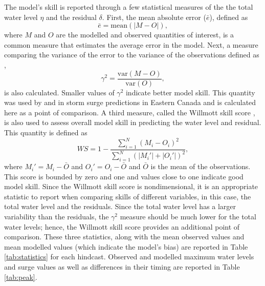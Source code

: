 \documentclass[letterpaper]{tATO2e}
\begin{document}
The model's skill is reported through a few statistical measures of the the total water level $\eta$ and the residual $\delta$. First, the mean absolute error ($\bar{e}$), defined as
\begin{equation}
\bar{e} = \text{mean}\left(\left| M - O \right|\right),
\end{equation}
where $M$ and $O$ are the modelled and observed quantities of interest, is a common measure that estimates the average error in the model. Next, a measure comparing the variance of the error to the variance of the observations defined as \citep{thompson2003prediction},
\begin{equation}
\gamma^2 = \frac{\text{var}\left(M-O\right)}{\text{var}\left(O\right)},
\end{equation}
is also calculated. Smaller values of $\gamma^2$ indicate better model skill. This quantity was used by \citet{bernier2006predicting} and \citet{bernier2010tide} in storm surge predictions in Eastern Canada and is calculated here as a point of comparison. A third measure, called the Willmott skill score \citep{willmott1982some}, is also used to assess overall model skill in predicting the water level and residual. This quantity is defined as
\begin{equation}
WS = 1 - \frac{\sum_{i=1}^N \left(M_i - O_i\right)^2}{\sum_{i=1}^N \left(|M_i'| + |O_i'|\right)^2},
\end{equation} 
where $M_i' = M_i-\bar{O}$ and $O_i'=O_i-\bar{O}$ and $\bar{O}$ is the mean of the observations. This score is bounded by zero and one and values close to one indicate good model skill. Since the Willmott skill score is nondimensional, it is an appropriate statistic to report when comparing skills of different variables, in this case, the total water level and the residuals. Since the total water level has a larger variability than the residuals, the $\gamma^2$ measure should be much lower for the total water levels; hence, the Willmott skill score provides an additional point of comparison. These three statistics, along with the mean observed values and mean modelled values (which indicate the model's bias) are reported in Table \ref{tab:statistics} for each hindcast.  {\color{red} Observed and modelled maximum water levels and surge values as well as differences in their timing are reported in Table \ref{tab:peak}.}
\end{document}
